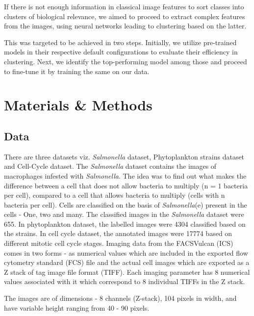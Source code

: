 \documentclass[12pt,a4paper]{article}
\begin{document}
If there is not enough information in classical image features to sort classes into clusters of biological relevance, we aimed to proceed to extract complex features from the images, using neural networks leading to clustering based on the latter.

This was targeted to be achieved in two steps. Initially, we utilize pre-trained models in their respective default configurations to evaluate their efficiency in clustering. Next, we identify the top-performing model among those and proceed to fine-tune it by training the same on our data.

\section{Materials \& Methods}
\subsection{Data}
There are three datasets viz. \textit{Salmonella} dataset, Phytoplankton strains dataset and Cell-Cycle dataset. The \textit{Salmonella} dataset contains the images of macrophages infested with \textit{Salmonella}. The idea was to find out what makes the difference between a cell that does not allow bacteria to multiply (n = 1 bacteria per cell), compared to a cell that allows bacteria to multiply (cells with n  bacteria per cell). Cells are classified on the basis of \textit{Salmonella}(e) present in the cells - One, two and many. The classified images in the \textit{Salmonella} dataset were 655. In phytoplankton dataset, the labelled images were 4304 classified based on the strains. In cell cycle dataset, the annotated images were 17774 based on different mitotic cell cycle stages. Imaging data from the FACSVulcan (ICS) comes in two forms - as numerical values which are included in the exported flow cytometry standard (FCS) file and the actual cell images which are exported as a Z stack of tag image file format (TIFF). Each imaging parameter has 8 numerical values associated with it which correspond to 8 individual TIFFs in the Z stack.

The images are of dimensions - 8 channels (Z-stack), 104 pixels in width, and have variable height ranging from 40 - 90 pixels.
\end{document}
